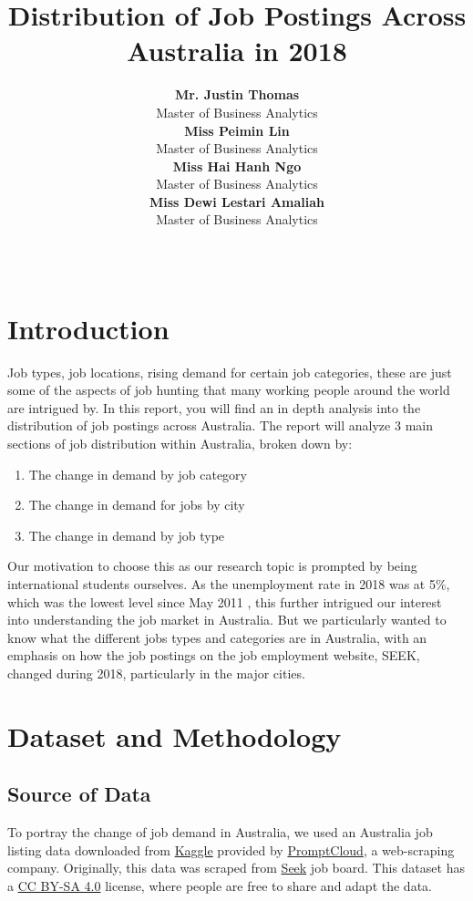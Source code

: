 \documentclass[11pt,a4paper,]{article}
\title{Distribution of Job Postings Across Australia in 2018}
\author{\sf\Large\textbf{Mr. Justin Thomas}\\ {\sf\large Master of Business Analytics\\[0.5cm]} \sf\Large\textbf{Miss Peimin Lin}\\ {\sf\large Master of Business Analytics\\[0.5cm]} \sf\Large\textbf{Miss Hai Hanh Ngo}\\ {\sf\large Master of Business Analytics\\[0.5cm]} \sf\Large\textbf{Miss Dewi Lestari Amaliah}\\ {\sf\large Master of Business Analytics\\[0.5cm]}}
\date{\sf\Date~\Month~\Year}
\makeatletter
\providecommand{\tightlist}{%
  \setlength{\itemsep}{0pt}\setlength{\parskip}{0pt}}
\def\titlepage{\front{\expandafter{\@title}}{\@author}{\@organization}}
\makeatother
\begin{document}
\titlepage

{
\setcounter{tocdepth}{2}
\tableofcontents
}
\clearpage

\hypertarget{introduction}{%
\section{Introduction}\label{introduction}}

Job types, job locations, rising demand for certain job categories, these are just some of the aspects of job hunting that many working people around the world are intrigued by. In this report, you will find an in depth analysis into the distribution of job postings across Australia. The report will analyze 3 main sections of job distribution within Australia, broken down by:

\begin{enumerate}
\def\labelenumi{\arabic{enumi})}
\tightlist
\item
  The change in demand by job category
\item
  The change in demand for jobs by city
\item
  The change in demand by job type
\end{enumerate}

Our motivation to choose this as our research topic is prompted by being international students ourselves. As the unemployment rate in 2018 was at 5\%, which was the lowest level since May 2011 \textcite{unemployment}, this further intrigued our interest into understanding the job market in Australia. But we particularly wanted to know what the different jobs types and categories are in Australia, with an emphasis on how the job postings on the job employment website, SEEK, changed during 2018, particularly in the major cities.

\hypertarget{dataset-and-methodology}{%
\section{Dataset and Methodology}\label{dataset-and-methodology}}

\hypertarget{source-of-data}{%
\subsection{Source of Data}\label{source-of-data}}

To portray the change of job demand in Australia, we used an Australia job listing data downloaded from \href{https://www.kaggle.com/PromptCloudHQ/australian-job-listings-data-from-seek-job-board}{Kaggle} provided by \href{https://www.promptcloud.com}{PromptCloud}, a web-scraping company. Originally, this data was scraped from \href{https://www.seek.com.au}{Seek} job board. This dataset has a \href{https://creativecommons.org/licenses/by-sa/4.0/}{CC BY-SA 4.0} license, where people are free to share and adapt the data.
\end{document}
